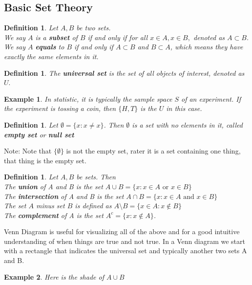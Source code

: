 \documentclass[11pt,oneside]{book}
\theoremstyle{newStyle}
\newtheorem{defn}[thm]{Definition}
\newtheorem{ex}{Example}[section]
\newcommand{\note}{\color{red}Note: \color{black}}
\begin{document}
\subsection[Basic Set Theory]{Basic Set Theory}
\begin{defn}
Let $A,B$ be two sets.\\
We say $A$ is a \textbf{subset} of $B$ if and only if for all $x\in A,x\in B,$ denoted as $A\subset B$.\\
We say $A$ \textbf{equals} to $B$ if and only if $A\subset B$ and $B\subset A$, which means they have exactly the same elements in it. 
\end{defn}
\begin{defn}
The \textbf{universal set} is the set of all objects of interest, denoted as $U.$ 
\end{defn}
\begin{ex}
In statistic, it is typically the sample space $S$ of an experiment. If the experiment is tossing a coin, then $\{H,T\}$ is the $U$ in this case.
\end{ex}
\begin{defn}
Let $\emptyset =\{x:x\neq x\}$. Then $\emptyset$ is a set with no elements in it, called \textbf{empty set} or \textbf{null set}
\end{defn}
\note  Note that $\{\emptyset\}$ is not the empty set, rater it is a set containing one thing, that thing is the empty set. \\
\begin{defn}
Let $A,B$ be sets. Then\\
The \textbf{union} of A and B is the set $A\cup B=\{x:x\in A \text{ or }x\in B\}$\\
The \textbf{intersection} of A and B is the set $A\cap B=\{x:x\in A\text{ and }x\in B\}$\\
The set $A$ minus set $B$ is defined as $A\setminus B=\{x\in A:x\notin B\}$\\
The \textbf{complement} of A is the set $A^c=\{x:x\notin A\}$.
\end{defn}
Venn Diagram is useful for visualizing all of the above and for a good intuitive understanding of when things are true and not true. In a Venn diagram we start with a rectangle that indicates the universal set and typically another two sets A and B.
\begin{ex}
Here is the shade of $A\cup B$ \begin{center}
\end{center}
\end{ex}
\end{document}
